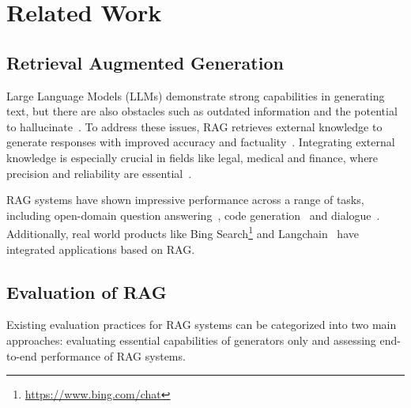 \section{Related Work}
\subsection{Retrieval Augmented Generation}

Large Language Models (LLMs) demonstrate strong capabilities in generating text, but there are also obstacles such as outdated information and the potential to hallucinate~\cite{tonmoy2024comprehensive, wang2023survey, huang2023survey}. To address these issues, RAG retrieves external knowledge to generate responses with improved accuracy and factuality~\cite{gao2023retrieval, yu2024evaluation, huang2024survey}. Integrating external knowledge is especially crucial in fields like legal, medical and finance, where precision and reliability are essential~\cite{louis2024interpretable, xiong2024benchmarking, zhang2023enhancing}.

RAG systems have shown impressive performance across a range of tasks, including open-domain question answering~\cite{mao2020generation, he2024g, lewis2020retrieval}, code generation~\cite{parvez2021retrieval, zhou2022docprompting, tan2024prompt} and dialogue~\cite{shuster2021retrieval, komeili2021internet, thulke2021efficient}. Additionally, real world products like Bing Search\footnote{\url{https://www.bing.com/chat}} and Langchain~\cite{langchain} have integrated applications based on RAG.

\subsection{Evaluation of RAG}
\label{sec:rw_evaluation_of_rag}
Existing evaluation practices for RAG systems can be categorized into two main approaches: evaluating essential capabilities of generators only and assessing end-to-end performance of RAG systems.

